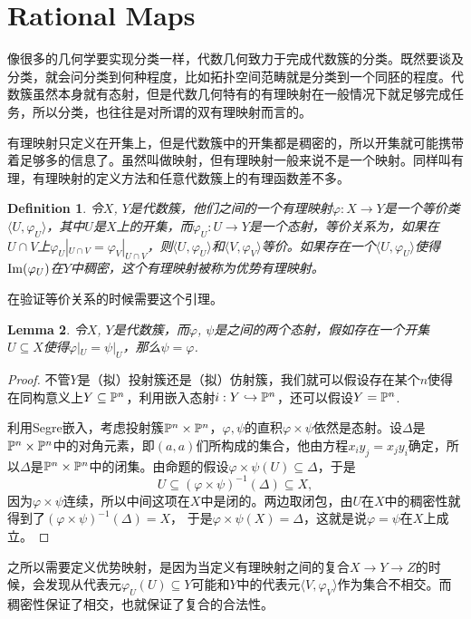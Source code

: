 \documentclass[9pt]{extarticle}
\theoremstyle{plain}%
\newtheorem{defi}{Definition}[section]%
\newtheorem{lem}[defi]{Lemma}%
\begin{document}
\section{Rational Maps}
像很多的几何学要实现分类一样，代数几何致力于完成代数簇的分类。既然要谈及分类，就会问分类到何种程度，比如拓扑空间范畴就是分类到一个同胚的程度。代数簇虽然本身就有态射，但是代数几何特有的有理映射在一般情况下就足够完成任务，所以分类，也往往是对所谓的双有理映射而言的。

有理映射只定义在开集上，但是代数簇中的开集都是稠密的，所以开集就可能携带着足够多的信息了。虽然叫做映射，但有理映射一般来说不是一个映射。同样叫有理，有理映射的定义方法和任意代数簇上的有理函数差不多。
\begin{defi}
令$X$, $Y$是代数簇，他们之间的一个有理映射$\varphi : X\to Y$是一个等价类$\langle U,\varphi_U\rangle$，其中$U$是$X$上的开集，而$\varphi_U:U\to Y$是一个态射，等价关系为，如果在$U\cap V$上$\varphi_U|_{U\cap V}=\varphi_V|_{U\cap V}$，则$\langle U,\varphi_U\rangle$和$\langle V,\varphi_V\rangle$等价。如果存在一个$\langle U,\varphi_U\rangle$使得$\operatorname{Im}(\varphi_U)$在$Y$中稠密，这个有理映射被称为优势有理映射。
\end{defi}
在验证等价关系的时候需要这个引理。
\begin{lem}
	令$X$, $Y$是代数簇，而$\varphi$, $\psi$是之间的两个态射，假如存在一个开集$U\subseteq X$使得$\varphi|_U=\psi|_U$，那么$\psi=\varphi$.
\end{lem}
\begin{proof}
	不管$Y$是（拟）投射簇还是（拟）仿射簇，我们就可以假设存在某个$n$使得在同构意义上$Y\subseteq \mathbb{P}^n$，利用嵌入态射$i:Y\hookrightarrow \mathbb{P}^n$，还可以假设$Y=\mathbb{P}^n$.

	利用Segre嵌入，考虑投射簇$\mathbb{P}^n\times \mathbb{P}^n$，$\varphi,\psi$的直积$\varphi\times \psi$依然是态射。设$\Delta$是$\mathbb{P}^n\times \mathbb{P}^n$中的对角元素，即$(a,a)$们所构成的集合，他由方程$x_iy_j=x_jy_i$确定，所以$\Delta$是$\mathbb{P}^n\times \mathbb{P}^n$中的闭集。由命题的假设$\varphi\times \psi(U)\subseteq \Delta$，于是
	\[
		U\subseteq (\varphi\times \psi)^{-1}(\Delta)\subseteq X,
	\]
	因为$\varphi\times \psi$连续，所以中间这项在$X$中是闭的。两边取闭包，由$U$在$X$中的稠密性就得到了$(\varphi\times \psi)^{-1}(\Delta)=X$，
	于是$\varphi\times \psi(X)=\Delta$，这就是说$\varphi=\psi$在$X$上成立。
\end{proof}
之所以需要定义优势映射，是因为当定义有理映射之间的复合$X\to Y \to Z$的时候，会发现从代表元$\varphi_U(U)\subseteq Y$可能和$Y$中的代表元$\langle V,\varphi_V\rangle$作为集合不相交。而稠密性保证了相交，也就保证了复合的合法性。
\end{document}
